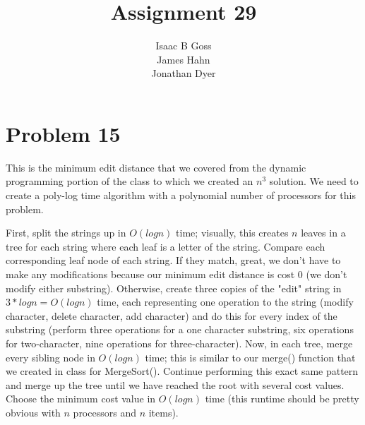 \documentclass{article}
\author{Isaac B Goss\\ James Hahn\\ Jonathan Dyer}
\title{Assignment 29}
\providecommand{\prob}[1]{\section*{Problem #1}}
\begin{document}
\maketitle

\prob{15}
This is the minimum edit distance that we covered from the dynamic programming portion of the class to which we created an $n^3$ solution.  We need to create a poly-log time algorithm with a polynomial number of processors for this problem.

First, split the strings up in $O(logn)$ time; visually, this creates $n$ leaves in a tree for each string where each leaf is a letter of the string.  Compare each corresponding leaf node of each string.  If they match, great, we don't have to make any modifications because our minimum edit distance is cost 0 (we don't modify either substring).  Otherwise, create three copies of the "edit" string in $3*logn = O(logn)$ time, each representing one operation to the string (modify character, delete character, add character) and do this for every index of the substring (perform three operations for a one character substring, six operations for two-character, nine operations for three-character).  Now, in each tree, merge every sibling node in $O(logn)$ time; this is similar to our merge() function that we created in class for MergeSort().  Continue performing this exact same pattern and merge up the tree until we have reached the root with several cost values.  Choose the minimum cost value in $O(logn)$ time (this runtime should be pretty obvious with $n$ processors and $n$ items).

\end{document}
